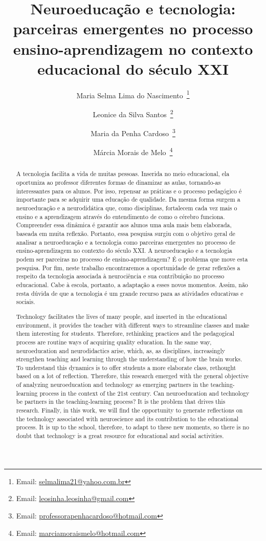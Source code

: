 \documentclass[portuguese]{textolivre}
\title{Neuroeducação e tecnologia: parceiras emergentes no processo ensino-aprendizagem no contexto educacional do século XXI}
\author[1]{Maria Selma Lima do Nascimento~\orcid{0000-0003-1000-3822}\thanks{Email: \href{mailto:selmalima21@yahoo.com.br}{selmalima21@yahoo.com.br}}}
\author[2]{Leonice da Silva Santos~\orcid{0000-0002-6248-339X}\thanks{Email: \href{mailto:leosinha.leosinha@gmail.com}{leosinha.leosinha@gmail.com}}}
\author[1]{Maria da Penha Cardoso~\orcid{0000-0001-8417-3141}\thanks{Email: \href{mailto:professorapenhacardoso@hotmail.com}{professorapenhacardoso@hotmail.com}}}
\author[1]{Márcia Morais de Melo~\orcid{0000-0002-3948-2612}\thanks{Email: \href{mailto:marciamoraismelo@hotmail.com}{marciamoraismelo@hotmail.com}}}
\affil[1]{World University Ecumenical-WUE. Florida Department of Education, Miami-FL, USA.}
\affil[2]{Universidad Autónoma de Asunción, Departamento de Pedagogía, Asunción, Paraguay.}
\begin{document}
\maketitle

\begin{polyabstract}
\begin{abstract}
A tecnologia facilita a vida de muitas pessoas. Inserida no meio educacional, ela oportuniza ao professor diferentes formas de dinamizar as aulas, tornando-as interessantes para os alunos. Por isso, repensar as práticas e o processo pedagógico é importante para se adquirir uma educação de qualidade. Da mesma forma surgem a neuroeducação e a neurodidática que, como disciplinas, fortalecem cada vez mais o ensino e a aprendizagem através do entendimento de como o cérebro funciona. Compreender essa dinâmica é garantir aos alunos uma aula mais bem elaborada, baseada em muita reflexão. Portanto, essa pesquisa surgiu com o objetivo geral de analisar a neuroeducação e a tecnologia como parceiras emergentes no processo de ensino-aprendizagem no contexto do século XXI. A neuroeducação e a tecnologia podem ser parceiras no processo de ensino-aprendizagem? É o problema que move esta pesquisa. Por fim, neste trabalho encontraremos a oportunidade de gerar reflexões a respeito da tecnologia associada à neurociência e sua contribuição no processo educacional. Cabe à escola, portanto, a adaptação a esses novos momentos. Assim, não resta dúvida de que a tecnologia é um grande recurso para as atividades educativas e sociais.

\end{abstract}

\begin{english}
\begin{abstract}
Technology facilitates the lives of many people, and inserted in the educational  environment, it provides the teacher with different ways to streamline classes and make them interesting for students. Therefore, rethinking practices and the pedagogical process are routine ways of acquiring quality education. In the same way, neuroeducation and neurodidactics arise, which, as, as disciplines, increasingly strengthen teaching and learning through the understanding of how the brain works. To understand this dynamics is to offer students a more elaborate class, rethought based on a lot of reflection. Therefore, this research emerged with the general objective of analyzing neuroeducation and technology as emerging partners in the teaching-learning process in the context of the 21st century. Can neuroeducation and technology be partners in the teaching-learning process? It is the problem that drives this research. Finally, in this work, we will find the opportunity to generate reflections on the technology associated with neuroscience and its contribution to the educational process. It is up to the school, therefore, to adapt to these new moments, so there is no doubt that technology is a great resource for educational and social activities.


\end{abstract}
\end{english}
\end{polyabstract}
\end{document}

